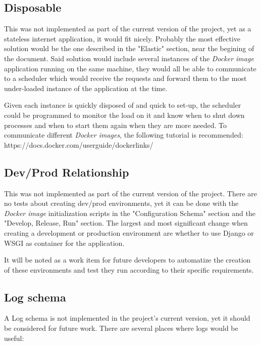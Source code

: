 \documentclass[10pt]{article}
\begin{document}
 \subsection{Disposable}
 
This was not implemented as part of the current version of the project, yet as a stateless internet application, it would fit nicely. Probably the most effective solution would be the one described in the "Elastic" section, near the begining of the document. Said solution would include several instances of the \textit{Docker image} application running on the same machine, they would all be able to communicate to a scheduler which would receive the requests and forward them to the most under-loaded instance of the application at the time. 

Given each instance is quickly disposed of and quick to set-up, the scheduler could be programmed to monitor the load on it and know when to shut down processes and when to start them again when they are more needed. To communicate different \textit{Docker images}, the following tutorial is recommended:\\

https://docs.docker.com/userguide/dockerlinks/\\
 
 \subsection{Dev/Prod Relationship}
 
This was not implemented as part of the current version of the project. There are no tests about creating dev/prod environments, yet it can be done with the \textit{Docker image} initialization scripts in the "Configuration Schema" section and the "Develop, Release, Run" section. The largest and most significant change when creating a development or production environment are whether to use Django or WSGI as container for the application. 

It will be noted as a work item for future developers to automatize the creation of these environments and test they run according to their specific requirements.
 
 \subsection{Log schema}
 
A Log schema is not implemented in the project's current version, yet it should be considered for future work. There are several places where logs would be useful:
\end{document}
